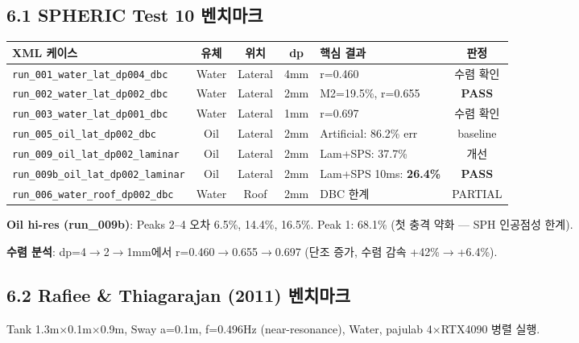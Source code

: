 \documentclass[10pt,a4paper]{article}
\begin{document}
\subsection{6.1 SPHERIC Test 10 벤치마크}

\begin{center}
\scriptsize
\begin{tabular}{lccclc}
\toprule
\textbf{XML 케이스} & \textbf{유체} & \textbf{위치} & \textbf{dp} & \textbf{핵심 결과} & \textbf{판정} \\
\midrule
\texttt{run\_001\_water\_lat\_dp004\_dbc} & Water & Lateral & 4mm & r=0.460 & 수렴 확인 \\
\texttt{run\_002\_water\_lat\_dp002\_dbc} & Water & Lateral & 2mm & M2=19.5\%, r=0.655 & \textcolor{pass}{\textbf{PASS}} \\
\texttt{run\_003\_water\_lat\_dp001\_dbc} & Water & Lateral & 1mm & r=0.697 & 수렴 확인 \\
\texttt{run\_005\_oil\_lat\_dp002\_dbc} & Oil & Lateral & 2mm & Artificial: 86.2\% err & baseline \\
\texttt{run\_009\_oil\_lat\_dp002\_laminar} & Oil & Lateral & 2mm & Lam+SPS: 37.7\% & 개선 \\
\texttt{run\_009b\_oil\_lat\_dp002\_laminar} & Oil & Lateral & 2mm & Lam+SPS 10ms: \textbf{26.4\%} & \textcolor{pass}{\textbf{PASS}} \\
\texttt{run\_006\_water\_roof\_dp002\_dbc} & Water & Roof & 2mm & DBC 한계 & \textcolor{partial}{PARTIAL} \\
\bottomrule
\end{tabular}
\end{center}

\textbf{Oil hi-res (run\_009b)}: Peaks 2--4 오차 6.5\%, 14.4\%, 16.5\%. Peak 1: 68.1\% (첫 충격 약화 --- SPH 인공점성 한계).

\textbf{수렴 분석}: dp=4$\rightarrow$2$\rightarrow$1mm에서 r=0.460$\rightarrow$0.655$\rightarrow$0.697 (단조 증가, 수렴 감속 +42\%$\rightarrow$+6.4\%).

\subsection{6.2 Rafiee \& Thiagarajan (2011) 벤치마크}

Tank 1.3m$\times$0.1m$\times$0.9m, Sway a=0.1m, f=0.496Hz (near-resonance), Water, pajulab 4$\times$RTX4090 병렬 실행.
\end{document}
